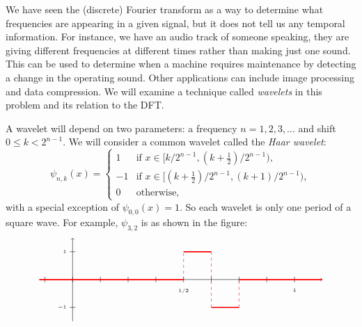\documentclass[12pt]{article}
\newcommand{\defn}[1]{{\color{darkred}\emph{#1}}} %
\begin{document}
We have seen the (discrete) Fourier transform as a way to determine what frequencies are appearing in a given signal, but it does not tell us any temporal information. For instance, we have an audio track of someone speaking, they are giving different frequencies at different times rather than making just one sound. This can be used to determine when a machine requires maintenance by detecting a change in the operating sound.
Other applications can include image processing and data compression.
We will examine a technique called \defn{wavelets} in this problem and its relation to the DFT.

\medskip

A wavelet will depend on two parameters: a frequency $n = 1, 2, 3, \ldots$ and shift $0 \leq k < 2^{n-1}$. We will consider a common wavelet called the \defn{Haar wavelet}:
\[
\psi_{n,k}(x) = \begin{cases}
1 & \text{if } x \in [k/2^{n-1},  (k+\frac{1}{2})/2^{n-1}), \\
-1 & \text{if } x \in [(k+\frac{1}{2})/2^{n-1}, (k+1)/2^{n-1}), \\
0 & \text{otherwise,}
\end{cases}
\]
with a special exception of $\psi_{0,0}(x) = 1$. So each wavelet is only one period of a square wave. For example, $\psi_{3,2}$ is as shown in the figure:
\[
\begin{tikzpicture}
\draw[->] (-1.2, 0) -- (9,0);
\draw[->] (0, -1.5) -- (0, 1.5);
\foreach \x in {-1,0,1,...,8}
  \draw[-] (\x, .1) -- (\x, -.1);
\foreach \y in {-1, 1}
  \draw[-] (.1, \y) -- (-.1, \y) node[anchor=east] {\tiny $\y$};
\draw (8,-.2) node[anchor=north] {\tiny $1$};
\draw (4,-.2) node[anchor=north] {\tiny $1/2$};
\draw[-,very thick,red] (-1.2,0) -- (4,0);
\draw[-,very thick,red] (4,1) -- (5,1);
\draw[-,very thick,red] (5,-1) -- (6,-1);
\draw[-,very thick,red] (6,0) -- (9,0);
\draw[dashed,red] (4,0) -- (4,1);
\draw[dashed,red] (5,1) -- (5,-1);
\draw[dashed,red] (6,-1) -- (6,0);
\end{tikzpicture}
\]
\end{document}
